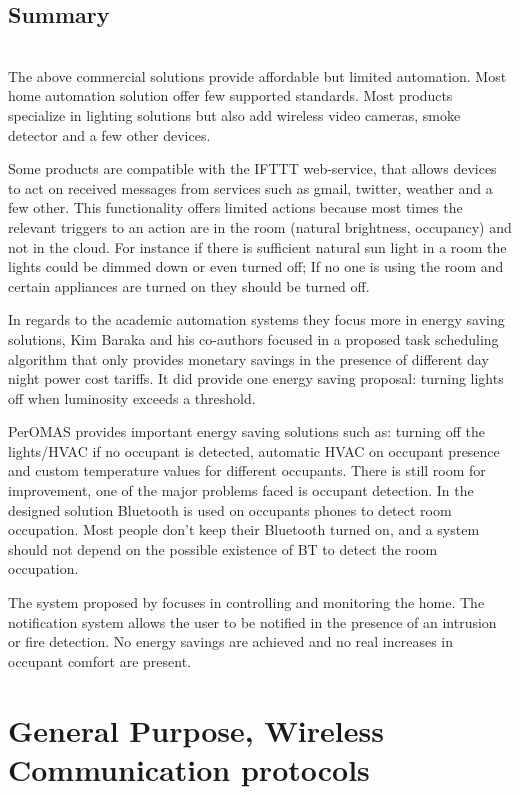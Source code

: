 \subsection{Summary}\mbox{}\\

The above commercial solutions provide affordable but limited automation. Most home automation solution offer few supported standards. Most products specialize in lighting solutions but also add wireless video cameras, smoke detector and a few other devices. 

Some products are compatible with the IFTTT web-service, that allows devices to act on received messages from services such as gmail, twitter, weather and a few other. This functionality offers limited actions because most times the relevant triggers to an action are in the room (natural brightness, occupancy) and not in the cloud. For instance if there is sufficient natural sun light in a room the lights could be dimmed down or even turned off; If no one is using the room and certain appliances are turned on they should be turned off. 

In regards to the academic automation systems they focus more in energy saving  solutions, Kim Baraka and his co-authors\cite{academic:arduino1} focused in a proposed task scheduling algorithm that only provides monetary savings in the presence of different day night power cost tariffs. It did provide one energy saving proposal: turning lights off when luminosity exceeds a threshold.

PerOMAS\cite{peromas} provides important energy saving solutions such as: turning off the lights/HVAC if no occupant is detected, automatic HVAC on occupant presence and custom temperature values for different occupants. There is still room for improvement, one of the major problems faced is occupant detection. In the designed solution Bluetooth is used on occupants phones to detect room occupation. Most people don't keep their Bluetooth turned on, and a system should not depend on the possible existence of BT to detect the room occupation. 

The system proposed by \cite{academic3} focuses in controlling and monitoring the home. The notification system allows the user to be notified in the presence of an intrusion or fire detection.
No energy savings are achieved and no real increases in occupant comfort are present.



\section{General Purpose, Wireless Communication protocols} \label{ssec:num2}

